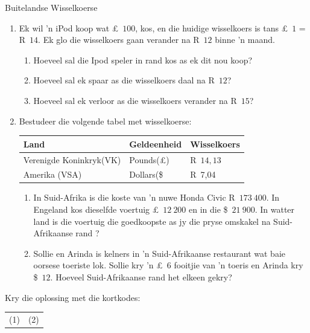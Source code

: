 \begin{exercises}{Buitelandse Wisselkoerse}
    \begin{enumerate}[label=\textbf{\arabic*}.]
	\item Ek wil ’n iPod koop wat £~$100$, kos, en die huidige wisselkoers is tans £~$1$ = R~$14$. Ek glo die wisselkoers gaan verander na R~$12$ binne ’n maand.
	\begin{enumerate}
	    \item Hoeveel sal die Ipod speler in rand kos as ek dit nou koop?
	    \item Hoeveel sal ek spaar as die wisselkoers daal na R~$12$?
	    \item Hoeveel sal ek verloor as die wisselkoers verander na R~$15$?
	\end{enumerate}

	\item Bestudeer die volgende tabel met wisselkoerse:
	\begin{center}
	    \begin{tabular}{ |l|l|l| }
		\hline
		Land	&	Geldeenheid 	&	Wisselkoers\\ \hline
		Verenigde Koninkryk(VK) 	&	Pounds(£)	&	R~$14,13$\\ \hline
		Amerika (VSA) 	&	Dollars(\$}	&	R~7,04\\ \hline
	    \end{tabular}
	\end{center}
	
	\begin{enumerate}
	    \item In Suid-Afrika is die koste van ’n nuwe Honda Civic R~$173~400$. In Engeland kos dieselfde voertuig £~$12~200$ en in die \$~$21~900$. In watter land is die voertuig die goedkoopste as jy die pryse
omskakel na Suid-Afrikaanse rand ?

	    \item Sollie en Arinda is kelners in ’n Suid-Afrikaanse restaurant wat baie oorsese toeriste lok. Sollie kry ’n £~$6$ fooitjie van ’n toeris en Arinda kry \$~$12$.  Hoeveel Suid-Afrikaanse rand het elkeen gekry?
	\end{enumerate}
    \end{enumerate}

    Kry die oplossing met die kortkodes:\\
    \begin{tabularx}{\textwidth}{ XX }
	(1)	&	(2)\\
    \end{tabularx}
\end{exercises}


